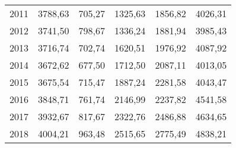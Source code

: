 \begin{center}
\begin{longtable}{|r|c|c|c|c|l|}
	2011 & 3788,63   & 705,27  & 1325,63  & 1856,82  & 4026,31 \\
	2012 & 3741,50   & 798,67  & 1336,24  & 1881,94  & 3985,43 \\
	2013 & 3716,74   & 702,74  & 1620,51  & 1976,92  & 4087,92 \\
	2014 & 3672,62   & 677,50  & 1712,50  & 2087,11  & 4013,05 \\
	2015 & 3675,54   & 715,47  & 1887,24  & 2281,58  & 4043,47 \\
	2016 & 3848,71   & 761,74  & 2146,99  & 2237,82  & 4541,58 \\
	2017 & 3932,67   & 817,67  & 2322,76  & 2486,88  & 4634,65 \\
	2018 & 4004,21   & 963,48  & 2515,65  & 2775,49  & 4838,21 \\ \hline
\end{longtable}
\end{center}

